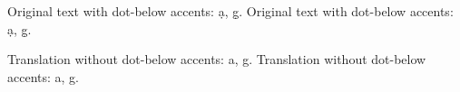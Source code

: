 \documentclass{article}
\begin{document}
\begin{pages}
\begin{Leftside}
\beginnumbering
\pstart \blindtext Original text with dot-below accents: \d{a}, \d{g}. \blindtext Original text with dot-below accents: \d{a}, \d{g}. \blindtext
\pend
\endnumbering
\end{Leftside}
\begin{Rightside}
\beginnumbering
\pstart  \blindtext Translation without dot-below accents: a, g. \blindtext Translation without dot-below accents: a, g. \blindtext
\pend
\endnumbering
\end{Rightside}
\end{pages}
\Pages
\end{document}
